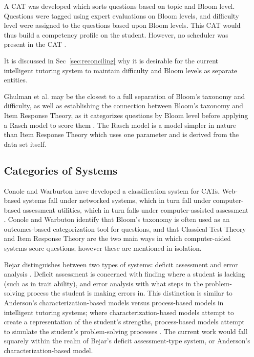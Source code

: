 A CAT was developed which sorts questions based on topic and Bloom level.
Questions were tagged using expert evaluations on Bloom levels, and difficulty
level were assigned to the questions based upon Bloom levels.  This CAT would
thus build a competency profile on the student.  However, no scheduler was
present in the CAT \cite{lilley2005generation}.

It is discussed in Sec~\ref{sec:reconciling} why it is desirable for the
current intelligent tutoring system to maintain difficulty and Bloom levels as
separate entities.

Ghulman et al. may be the closest to a full separation of Bloom's taxonomy and
difficulty, as well as establishing the connection between Bloom's taxonomy and
Item Response Theory, as it categorizes questions by Bloom level before
applying a Rasch model to score them \cite{ghulman2009modern}.  The Rasch model
is a model simpler in nature than Item Response Theory which uses one parameter
and is derived from the data set itself.

\subsection{Categories of Systems}

Conole and Warburton have developed a classification system for CATs.
Web-based systems \cite{wang2004web} fall under networked systems, which in
turn fall under computer-based assessment utilities, which in turn falls under
computer-assisted assessment \cite{conole2005review}.  Conole and Warbuton
identify that Bloom's taxonomy is often used as an outcomes-based
categorization tool for questions, and that Classical Test Theory and Item
Response Theory are the two main ways in which computer-aided systems score
questions; however these are mentioned in isolation.

Bejar distinguishes between two types of systems: deficit assessment and error
analysis \cite{bejar1984educational}.  Deficit assessment is concerned with
finding where a student is lacking (such as in trait ability), and error
analysis with what steps in the problem-solving process the student is making
errors in.  This distinction is similar to Anderson's characterization-based
models versus process-based models in intelligent tutoring systems; where
characterization-based models attempt to create a representation of the
student's strengths, process-based models attempt to simulate the student's
problem-solving processes \cite{anderson1996act}.  The current work would fall
squarely within the realm of Bejar's deficit assessment-type system, or
Anderson's characterization-based model.

